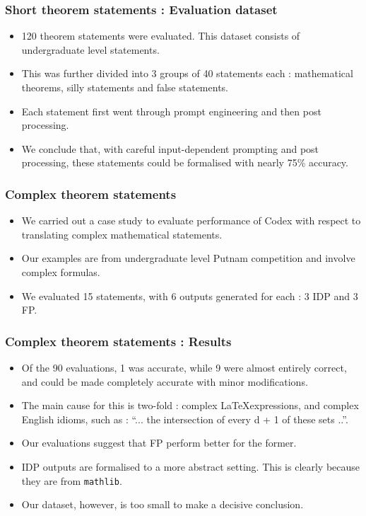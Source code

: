 \documentclass{beamer} %
\begin{document}
\begin{frame}
\frametitle{Short theorem statements : Evaluation dataset}
\begin{itemize}
\item [\textbullet] 120 theorem statements were evaluated. This dataset consists of undergraduate level statements. \pause
\item [\textbullet] This was further divided into 3 groups of 40 statements each : mathematical theorems, silly statements and false statements. \pause
\item [\textbullet] Each statement first went through prompt engineering and then post processing. \pause
\item [\textbullet] We conclude that, with careful input-dependent prompting and post processing, these statements could be formalised with nearly 75\% accuracy.
\end{itemize}
\end{frame}
\begin{frame}
\frametitle{Complex theorem statements}
\begin{itemize}
\item [\textbullet] We carried out a case study to evaluate performance of Codex with respect to translating complex mathematical statements. \pause
\item [\textbullet] Our examples are from undergraduate level Putnam competition and
involve complex formulas. \pause
\item [\textbullet] We evaluated 15 statements, with 6 outputs generated for each : 3 IDP and 3 FP. 
\end{itemize}
\end{frame}
\begin{frame}
\frametitle{Complex theorem statements : Results}
\begin{itemize}
\item [\textbullet]  Of the 90 evaluations, 1 was accurate, while 9 were almost entirely correct, and could be made completely accurate with minor modifications. \pause
\item [\textbullet] The main cause for this is two-fold : complex \LaTeX expressions, and complex English idioms, such as : ``... the intersection of every d + 1 of these sets ..''. \pause
\item [\textbullet] Our evaluations suggest that FP perform better for the former. \pause
\item [\textbullet] IDP outputs are formalised to a more abstract setting. This is clearly because they are from \texttt{mathlib}. \pause
\item [\textbullet] Our dataset, however, is too small to make a decisive conclusion.    
\end{itemize}
\end{frame}
\end{document}
